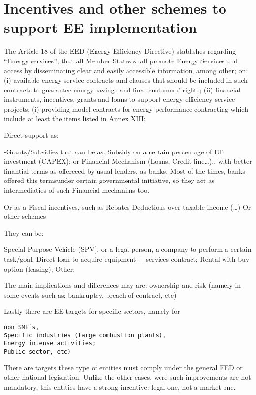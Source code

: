 \documentclass[]{book}
\theoremstyle{definition}
\theoremstyle{definition}
\theoremstyle{definition}
\theoremstyle{remark}
\begin{document}
\section{Incentives and other schemes to support EE
implementation}\label{incentives-and-other-schemes-to-support-ee-implementation}

The Article 18 of the EED (Energy Efficiency Directive) stablishes
regarding ``Energy services'', that all Member States shall promote
Energy Services and access by disseminating clear and easily accessible
information, among other; on: (i) available energy service contracts and
clauses that should be included in such contracts to guarantee energy
savings and final customers' rights; (ii) financial instruments,
incentives, grants and loans to support energy efficiency service
projects; (i) providing model contracts for energy performance
contracting which include at least the items listed in Annex XIII;

Direct support as:

-Grants/Subsidies that can be as: Subsidy on a certain percentage of EE
investment (CAPEX); or Financial Mechanism (Loans, Credit
line\ldots{})., with better finantial terms as offereced by usual
lenders, as banks. Most of the times, banks offered this termsunder
certain governmental initiative, so they act as intermediaties of such
Financial mechanims too.

Or as a Fiscal incentives, such as Rebates Deductions over taxable
income (\ldots{}) Or other schemes

They can be:

Special Purpose Vehicle (SPV), or a legal person, a company to perform a
certain task/goal, Direct loan to acquire equipment + services contract;
Rental with buy option (leasing); Other;

The main implications and differences may are: ownership and risk
(namely in some events such as: bankruptcy, breach of contract, etc)

Lastly there are EE targets for specific sectors, namely for

\begin{verbatim}
non SME´s, 
Specific industries (large combustion plants), 
Energy intense activities;
Public sector, etc)
\end{verbatim}

There are targets these type of entities must comply under the general
EED or other national legislation. Unlike the other cases, were such
improvements are not mandatory, this entities have a strong incentive:
legal one, not a market one.
\end{document}
